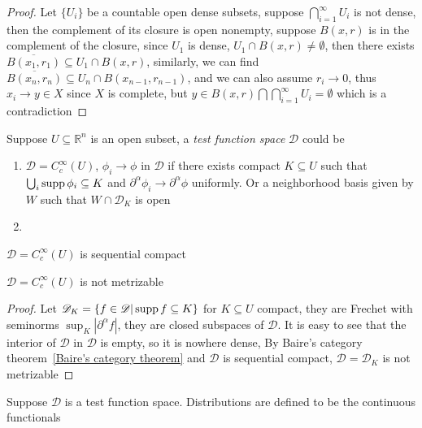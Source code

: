 \documentclass[main]{subfiles}
\begin{document}
\begin{proof}
Let $\{U_i\}$ be a countable open dense subsets, suppose $\displaystyle\bigcap_{i=1}^\infty U_i$ is not dense, then the complement of its closure is open nonempty, suppose $B(x,r)$ is in the complement of the closure, since $U_1$ is dense, $U_1\cap B(x,r)\neq\emptyset$, then there exists $\overline{B(x_1,r_1)}\subseteq U_1\cap B(x,r)$, similarly, we can find $\overline{B(x_n,r_n)}\subseteq U_n\cap B(x_{n-1},r_{n-1})$, and we can also assume $r_i\to0$, thus $x_i\to y\in X$ since $X$ is complete, but $y\in B(x,r)\displaystyle\bigcap\bigcap_{i=1}^\infty U_i=\emptyset$ which is a contradiction
\end{proof}

\begin{definition}
Suppose $U\subseteq\mathbb R^n$ is an open subset, a \textit{test function space} $\mathscr D$ could be
\begin{enumerate}
\item $\mathscr D=C_c^\infty(U)$, $\phi_i\to\phi$ in $\mathscr D$ if there exists compact $K\subseteq U$ such that $\bigcup_i\operatorname{supp}\phi_i\subseteq K$ and $\partial^\alpha\phi_i\to\partial^\alpha\phi$ uniformly. Or a neighborhood basis given by $W$ such that $W\cap \mathscr D_K$ is open
\item 
\end{enumerate}
\end{definition}

\begin{theorem}
$\mathscr D=C^\infty_c(U)$ is sequential compact
\end{theorem}

\begin{theorem}
$\mathscr D=C^\infty_c(U)$ is not metrizable
\end{theorem}

\begin{proof}
Let $\mathscr D_K=\{f\in\mathscr D|\operatorname{supp} f\subseteq K\}$ for $K\subseteq U$ compact, they are Frechet with seminorms $\sup_{K}|\partial^\alpha f|$, they are closed subspaces of $\mathscr D$. It is easy to see that the interior of $\mathscr D$ in $\mathscr D$ is empty, so it is nowhere dense, By Baire's category theorem~\ref{Baire's category theorem} and $\mathscr D$ is sequential compact, $\mathscr D=\mathscr D_K$ is not metrizable
\end{proof}

\begin{definition}
Suppose $\mathscr D$ is a test function space. Distributions are defined to be the continuous functionals
\end{definition}
\end{document}
